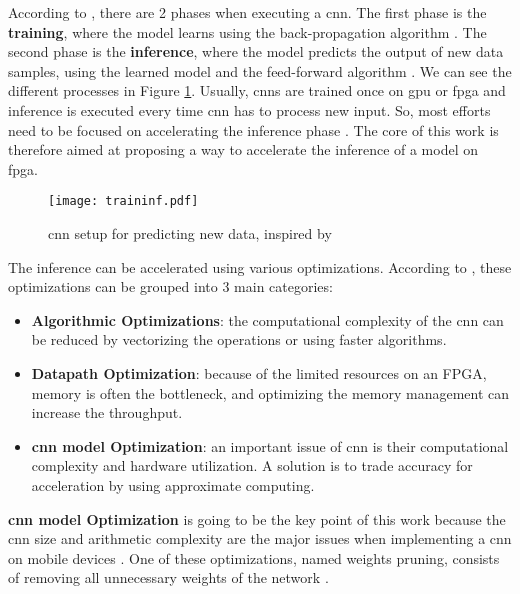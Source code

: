 According to \textcite{abdelouahab_accelerating_2018}, there are 2 phases when executing a \acrshort{cnn}. The first phase is the \textbf{training}, where the model learns using the back-propagation algorithm \cite{lecun_backpropagation_1989}. The second phase is the \textbf{inference}, where the model predicts the output of new data samples, using the learned model and the feed-forward algorithm \cite{zhang_optimizing_2015}. We can see the different processes in Figure \ref{fig:traininf}. Usually, \acrshort{cnn}s are trained once on \acrshort{gpu} or \acrshort{fpga} and inference is executed every time \acrshort{cnn} has to process new input. So, most efforts need to be focused on accelerating the inference phase \cite{abdelouahab_accelerating_2018}. The core of this work is therefore aimed at proposing a way to accelerate the inference of a model on \acrshort{fpga}.
%
\begin{figure}[H]
    \texttt{[image: traininf.pdf]}
    \caption{\acrshort{cnn} setup for predicting new data, inspired by \cite{nurvitadhi_can_2017}}
    \label{fig:traininf}
\end{figure}

The inference can be accelerated using various optimizations. According to \textcite{abdelouahab_accelerating_2018}, these optimizations can be grouped into 3 main categories:
\begin{itemize}
    \item \textbf{Algorithmic Optimizations}: the computational complexity of the \acrshort{cnn} can be reduced by vectorizing the operations or using faster algorithms.
    \item \textbf{Datapath Optimization}: because of the limited resources on an FPGA, memory is often the bottleneck, and optimizing the memory management can increase the throughput.
    \item \textbf{\acrshort{cnn} model Optimization}: an important issue of \acrshort{cnn} is their computational complexity and hardware utilization. A solution is to trade accuracy for acceleration by using approximate computing.
\end{itemize}

\textbf{\acrshort{cnn} model Optimization} is going to be the key point of this work because the \acrshort{cnn} size and arithmetic complexity are the major issues when implementing a \acrshort{cnn} on mobile devices \cite{cheng_recent_2018}. One of these optimizations, named weights pruning, consists of removing all unnecessary weights of the network \cite{abdelouahab_accelerating_2018}.

